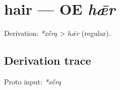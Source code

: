 \documentclass[
  british,
  a4paper,
  openany]{book}
\providecommand{\texorpdfstring}[2]{#1}
\begin{document}
\section{\texorpdfstring{hair --- OE
\emph{hǣr}}{hair --- OE hǣr}}\label{hair-oe-hux1e3r}


Derivation: \emph{*xḗrą} \textgreater{} \emph{hǣr} (regular).

\subsection{Derivation trace}\label{derivation-trace-25}

Proto input: \emph{*xḗrą}

\begingroup
\setlength{\fboxsep}{6pt}
\end{document}
